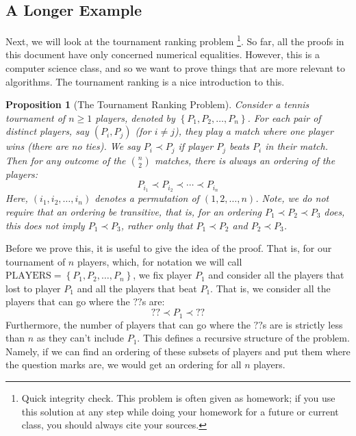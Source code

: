 \documentclass{article}
\theoremstyle{plain}
\newtheorem{proposition}[theorem]{Proposition}
\theoremstyle{definition}
\begin{document}
\subsection{A Longer Example}

Next, we will look at the tournament ranking problem 
\footnote{Quick integrity check. This problem is often given as homework; if you use this solution at any step while doing your homework for a future or current class, you should always cite your sources.}.
So far, all the proofs in this document have only concerned numerical equalities. However, this is a computer science class, and so we want to prove things that are more relevant to algorithms. The tournament ranking is a nice introduction to this.

\begin{proposition}[The Tournament Ranking Problem]
    Consider a tennis tournament of \(n \geq 1\) players, denoted by \(\left\{P_1, P_2, \dotsc, P_n\right\}\). For each pair of distinct players, say \((P_i, P_j)\) (for \(i \neq j\)), they play a match where one player wins (there are no ties). We say \(P_i \prec P_j\) if player \(P_j\) beats \(P_i\) in their match. Then for any outcome of the \(\binom{n}{2}\) matches, there is always an ordering of the players:
    \[P_{i_1} \prec P_{i_2} \prec \cdots \prec P_{i_n}\]
    Here, \((i_1, i_2, \dotsc, i_n)\) denotes a permutation of \((1, 2, \dotsc, n)\). Note, we do \emph{not} require that an ordering be transitive, that is, for an ordering \(P_1 \prec P_2 \prec P_3\) does, this does \emph{not} imply \(P_1 \prec P_3\), rather only that \(P_1 \prec P_2\) and \(P_2 \prec P_3\).
\end{proposition}

\vspace{0.1in}

Before we prove this, it is useful to give the idea of the proof. That is, for our tournament of \(n\) players, which, for notation we will call \(\text{PLAYERS} = \left\{P_1, P_2, \dotsc, P_n\right\}\), we fix player \(P_1\) and consider all the players that lost to player \(P_1\) and all the players that beat \(P_1\). That is, we consider all the players that can go where the \(??\)s are:
\[?? \prec P_1 \prec ??\]
Furthermore, the number of players that can go where the \(??\)s are is strictly less than \(n\) as they can't include \(P_1\). This defines a recursive structure of the problem. Namely, if we can find an ordering of these subsets of players and put them where the question marks are, we would get an ordering for all \(n\) players.
\end{document}
